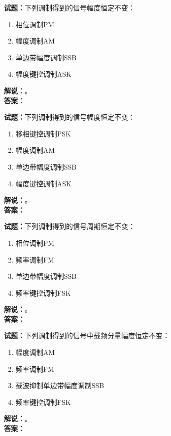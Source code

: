 \documentclass{ctexbook}
\begin{document}
\vspace{\baselineskip}

\noindent\textbf{试题：}下列调制得到的信号幅度恒定不变：
\begin{enumerate}[leftmargin=3em]
  \item 相位调制PM
  \item 幅度调制AM
  \item 单边带幅度调制SSB
  \item 幅度键控调制ASK
\end{enumerate}
\noindent\textbf{解说：}\textbf{}。\\\noindent\textbf{答案：}

\vspace{\baselineskip}

\noindent\textbf{试题：}下列调制得到的信号幅度恒定不变：
\begin{enumerate}[leftmargin=3em]
  \item 移相键控调制PSK
  \item 幅度调制AM
  \item 单边带幅度调制SSB
  \item 幅度键控调制ASK
\end{enumerate}
\noindent\textbf{解说：}\textbf{}。\\\noindent\textbf{答案：}

\vspace{\baselineskip}

\noindent\textbf{试题：}下列调制得到的信号周期恒定不变：
\begin{enumerate}[leftmargin=3em]
  \item 相位调制PM
  \item 频率调制FM
  \item 单边带幅度调制SSB
  \item 频率键控调制FSK
\end{enumerate}
\noindent\textbf{解说：}\textbf{}。\\\noindent\textbf{答案：}

\vspace{\baselineskip}

\noindent\textbf{试题：}下列调制得到的信号中载频分量幅度恒定不变：
\begin{enumerate}[leftmargin=3em]
  \item 幅度调制AM
  \item 频率调制FM
  \item 载波抑制单边带幅度调制SSB
  \item 频率键控调制FSK
\end{enumerate}
\noindent\textbf{解说：}\textbf{}。\\\noindent\textbf{答案：}
\end{document}
